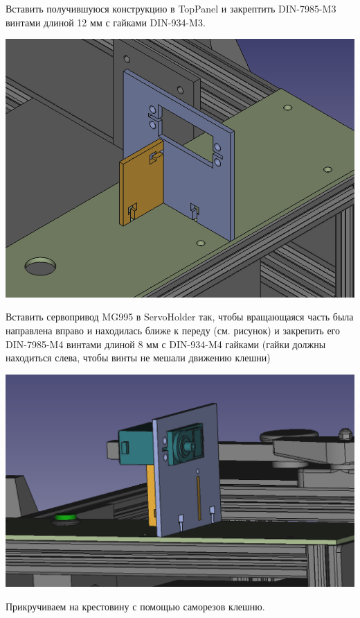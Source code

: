 \documentclass[12pt,a4paper,oneside]{article}
\begin{document}
Вставить получившуюся конструкцию в TopPanel и закрептить DIN-7985-M3 винтами
длиной 12 мм с гайками DIN-934-M3.

\includegraphics[width=\textwidth]{servoholder-toppanel}

Вставить сервопривод MG995 в ServoHolder так, чтобы вращающаяся часть была
направлена вправо и находилась ближе к переду (см. рисунок) и закрепить его
DIN-7985-M4 винтами длиной 8 мм с DIN-934-M4 гайками (гайки должны находиться слева, чтобы
винты не мешали движению клешни)

\includegraphics[width=\textwidth]{installedservo}

Прикручиваем на крестовину с помощью саморезов клешню.
\end{document}
